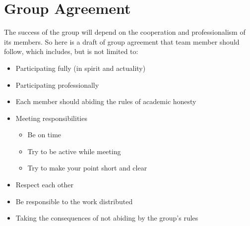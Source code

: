 \newpage
\section{Group Agreement}
The success of the group will depend on the cooperation and professionalism of its members. So here is a draft of group agreement that team member should follow, which includes, but is not limited to:
\begin{itemize}
    \item Participating fully (in spirit and actuality)
    \item Participating professionally
    \item Each member should abiding the rules of academic honesty
    \item Meeting responsibilities
    \begin{itemize}
        \item Be on time
        \item Try to be active while meeting
        \item Try to make your point short and clear
    \end{itemize}
    \item Respect each other
    \item Be responsible to the work distributed
    \item Taking the consequences of not abiding by the group's rules
\end{itemize}
    
